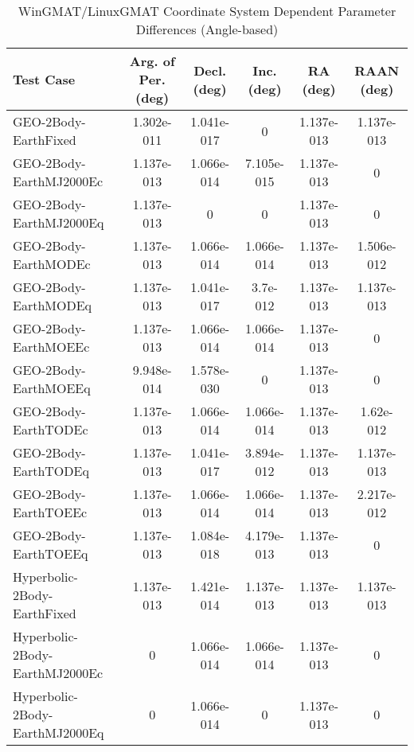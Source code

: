 \begin{table}[htbp!]
\centering
\caption{ WinGMAT/LinuxGMAT Coordinate System Dependent Parameter Differences (Angle-based)}
      \begin{tabular}{lccccc}
      \hline\hline
          Test Case & Arg. of Per. (deg) & Decl. (deg) & Inc. (deg) & RA (deg) & RAAN (deg) \\
         \hline
         GEO-2Body-EarthFixed & 1.302e-011 & 1.041e-017 & 0 & 1.137e-013 & 1.137e-013 \\
         GEO-2Body-EarthMJ2000Ec & 1.137e-013 & 1.066e-014 & 7.105e-015 & 1.137e-013 & 0 \\
         GEO-2Body-EarthMJ2000Eq & 1.137e-013 & 0 & 0 & 1.137e-013 & 0 \\
         GEO-2Body-EarthMODEc & 1.137e-013 & 1.066e-014 & 1.066e-014 & 1.137e-013 & 1.506e-012 \\
         GEO-2Body-EarthMODEq & 1.137e-013 & 1.041e-017 & 3.7e-012 & 1.137e-013 & 1.137e-013 \\
         GEO-2Body-EarthMOEEc & 1.137e-013 & 1.066e-014 & 1.066e-014 & 1.137e-013 & 0 \\
         GEO-2Body-EarthMOEEq & 9.948e-014 & 1.578e-030 & 0 & 1.137e-013 & 0 \\
         GEO-2Body-EarthTODEc & 1.137e-013 & 1.066e-014 & 1.066e-014 & 1.137e-013 & 1.62e-012 \\
         GEO-2Body-EarthTODEq & 1.137e-013 & 1.041e-017 & 3.894e-012 & 1.137e-013 & 1.137e-013 \\
         GEO-2Body-EarthTOEEc & 1.137e-013 & 1.066e-014 & 1.066e-014 & 1.137e-013 & 2.217e-012 \\
         GEO-2Body-EarthTOEEq & 1.137e-013 & 1.084e-018 & 4.179e-013 & 1.137e-013 & 0 \\
         Hyperbolic-2Body-EarthFixed & 1.137e-013 & 1.421e-014 & 1.137e-013 & 1.137e-013 & 1.137e-013 \\
         Hyperbolic-2Body-EarthMJ2000Ec & 0 & 1.066e-014 & 1.066e-014 & 1.137e-013 & 0 \\
         Hyperbolic-2Body-EarthMJ2000Eq & 0 & 1.066e-014 & 0 & 1.137e-013 & 0 \\

\end{tabular}
\end{table}
